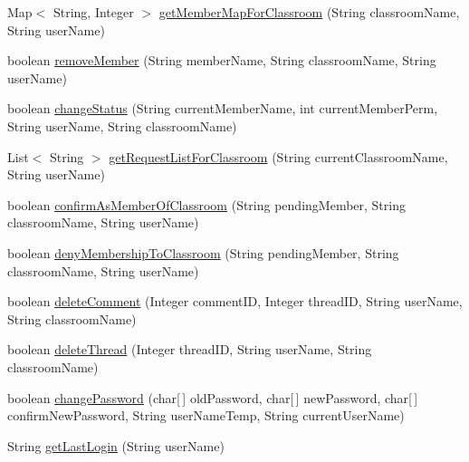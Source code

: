 \begin{DoxyCompactItemize}
\item 
\-Map$<$ \-String, \-Integer $>$ \hyperlink{classclient_1_1_client_a0637497f7ff5b09707224c621de977a0}{get\-Member\-Map\-For\-Classroom} (\-String classroom\-Name, \-String user\-Name)
\item 
boolean \hyperlink{classclient_1_1_client_a48d14df9205a77881a1b16e69ec85147}{remove\-Member} (\-String member\-Name, \-String classroom\-Name, \-String user\-Name)
\item 
boolean \hyperlink{classclient_1_1_client_a572f537598d1cec179b6d04be55b771b}{change\-Status} (\-String current\-Member\-Name, int current\-Member\-Perm, \-String user\-Name, \-String classroom\-Name)
\item 
\-List$<$ \-String $>$ \hyperlink{classclient_1_1_client_a82f76a20765200eb5a24e8dc3f8f4785}{get\-Request\-List\-For\-Classroom} (\-String current\-Classroom\-Name, \-String user\-Name)
\item 
boolean \hyperlink{classclient_1_1_client_a549eafdc02ef7fee64578e4994b580d5}{confirm\-As\-Member\-Of\-Classroom} (\-String pending\-Member, \-String classroom\-Name, \-String user\-Name)
\item 
boolean \hyperlink{classclient_1_1_client_af95c82c41a0c4d2b39111968467d3e9a}{deny\-Membership\-To\-Classroom} (\-String pending\-Member, \-String classroom\-Name, \-String user\-Name)
\item 
boolean \hyperlink{classclient_1_1_client_a40f331ef632564650106aedf89dd1029}{delete\-Comment} (\-Integer comment\-I\-D, \-Integer thread\-I\-D, \-String user\-Name, \-String classroom\-Name)
\item 
boolean \hyperlink{classclient_1_1_client_af6703c4d873557e34237a18a31bd4418}{delete\-Thread} (\-Integer thread\-I\-D, \-String user\-Name, \-String classroom\-Name)
\item 
boolean \hyperlink{classclient_1_1_client_a8f3f23677da021925724d8ac477bab8b}{change\-Password} (char\mbox{[}$\,$\mbox{]} old\-Password, char\mbox{[}$\,$\mbox{]} new\-Password, char\mbox{[}$\,$\mbox{]} confirm\-New\-Password, \-String user\-Name\-Temp, \-String current\-User\-Name)
\item 
\-String \hyperlink{classclient_1_1_client_aeaf46933d992b53d534b3596872fd162}{get\-Last\-Login} (\-String user\-Name)
\end{DoxyCompactItemize}


